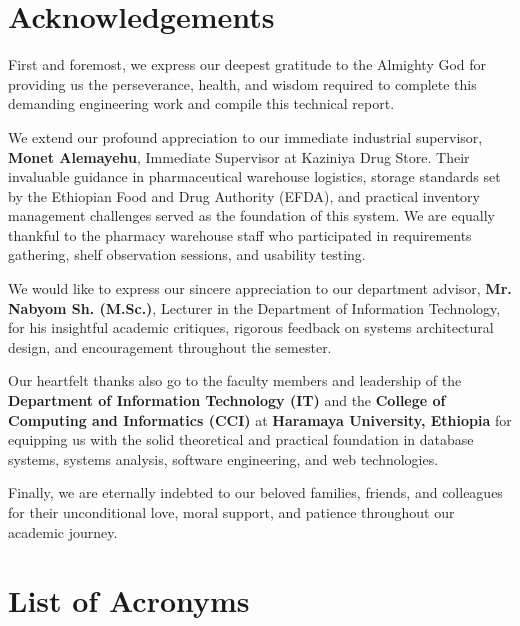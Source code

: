 \clearpage

\chapter*{Acknowledgements}

First and foremost, we express our deepest gratitude to the Almighty God for providing us the perseverance, health, and wisdom required to complete this demanding engineering work and compile this technical report.

We extend our profound appreciation to our immediate industrial supervisor, \textbf{Monet Alemayehu}, Immediate Supervisor at Kaziniya Drug Store. Their invaluable guidance in pharmaceutical warehouse logistics, storage standards set by the Ethiopian Food and Drug Authority (EFDA), and practical inventory management challenges served as the foundation of this system. We are equally thankful to the pharmacy warehouse staff who participated in requirements gathering, shelf observation sessions, and usability testing.

We would like to express our sincere appreciation to our department advisor, \textbf{Mr. Nabyom Sh. (M.Sc.)}, Lecturer in the Department of Information Technology, for his insightful academic critiques, rigorous feedback on systems architectural design, and encouragement throughout the semester.

Our heartfelt thanks also go to the faculty members and leadership of the \textbf{Department of Information Technology (IT)} and the \textbf{College of Computing and Informatics (CCI)} at \textbf{Haramaya University, Ethiopia} for equipping us with the solid theoretical and practical foundation in database systems, systems analysis, software engineering, and web technologies.

Finally, we are eternally indebted to our beloved families, friends, and colleagues for their unconditional love, moral support, and patience throughout our academic journey.

\clearpage

\chapter*{List of Acronyms}

